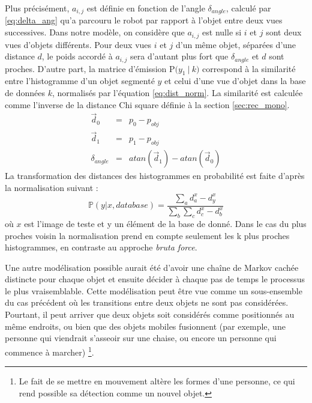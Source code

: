 Plus précisément,  $a_{i,j}$ est définie en fonction de l'angle $\delta_{angle}$, calculé par \ref{eq:delta_ang} qu'a parcouru le robot par rapport à l'objet entre deux vues successives. Dans notre modèle, on considère que $a_{i,j}$ est nulle si $i$ et $j$ sont deux vues d'objets différents. Pour deux vues $i$ et $j$ d'un même objet, séparées d'une distance $d$, le poids accordé à $a_{i,j}$ sera d'autant plus fort que $\delta_{angle}$ et $d$ sont proches. D'autre part, la matrice d'émission $\mathrm{P}\big( y_1 \ | \ k \big)$ correspond à la similarité entre l'histogramme d'un objet segmenté $y$ et celui d'une vue d'objet dans la base de données $k$, normalisés par l'équation \ref{eq:dist_norm}. La similarité est calculée comme l'inverse de la distance Chi square définie à la section \ref{sec:rec_mono}.
  \begin{equation}
  \begin{array}{rcl}
    \vec{d}_0 &=& p_0 - p_{obj}\\
    \vec{d}_1 &=& p_1 - p_{obj} \\
     \delta_{angle} &=& atan(\vec{d}_1) - atan(\vec{d}_0)
  \end{array}
  \label{eq:delta_ang}
  \end{equation}
La transformation des distances des histogrammes en probabilité est faite d'après la normalisation suivant :
\begin{equation}
	\mathbb{P}(y|x, database) = \frac{\sum_a d_a^x - d_y^x}{\sum_b \sum_c d_c^x - d_b^x}
	\label{eq:dist_norm}
\end{equation}
où $x$ est l'image de teste et y un élément de la base de donné. Dans le cas du plus proches voisin la normalisation prend en compte seulement les k plus proches histogrammes, en contraste au approche \textit{bruta force}.

Une autre modélisation possible aurait été d'avoir une chaîne de Markov
cachée distincte pour chaque objet et ensuite décider à chaque pas de temps le
processus le plus vraisemblable. Cette modélisation peut être vue comme un sous-ensemble du cas
précédent où les transitions entre deux objets ne sont pas
considérées. Pourtant, il peut arriver que deux objets soit considérés comme positionnés au même endroits, ou bien que des objets mobiles fusionnent (par exemple, une personne qui viendrait s'asseoir sur une chaise, ou encore un personne
qui commence à marcher) \footnote{Le fait de se mettre en mouvement
  altère les formes d'une personne, ce qui rend possible sa détection
  comme un nouvel objet.}.

